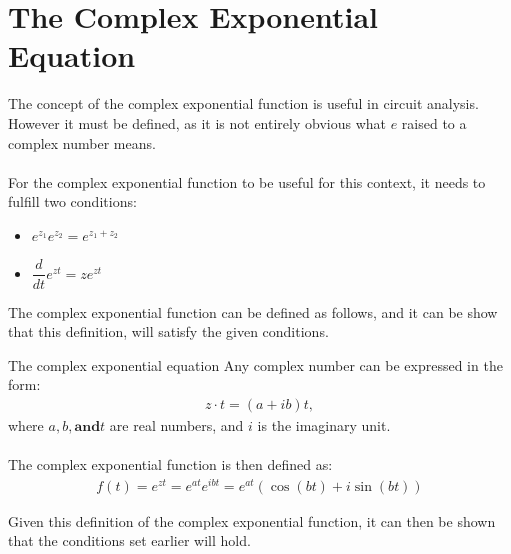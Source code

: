 \section{The Complex Exponential Equation}
The concept of the complex exponential function is useful in circuit analysis. However it must be defined, as it is not entirely obvious what $e$ raised to a complex number means.
\\
\\
For the complex exponential function to be useful for this context, it needs to fulfill two conditions:
\begin{itemize}
	\item $e^{z_1}e^{z_2} = e^{z_1 + z_2}$
	\item $\dfrac{d}{dt}e^{zt} = ze^{zt}$
\end{itemize}
The complex exponential function can be defined as follows, and it can be show that this definition, will satisfy the given conditions.

\begin{definition}{The complex exponential equation}{}
Any complex number can be expressed in the form:
\begin{align*}
	z \cdot t = (a + ib)t,
\end{align*}
where $a, b, \textbf{and} t$ are real numbers, and $i$ is the imaginary unit.
\\
\\
The complex exponential function is then defined as:
\begin{align*}
	f(t)=e^{zt}=e^{at}e^{ibt}=e^{at}\left(\cos(bt)+i\sin(bt)\right)
\end{align*}
\end{definition}

Given this definition of the complex exponential function, it can then be shown that the conditions set earlier will hold.


